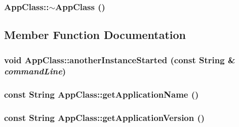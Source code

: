 \hypertarget{class_app_class_1bd714a99c6dadf6d662e15f27c77367}{
\subsubsection[{$\sim$AppClass}]{\setlength{\rightskip}{0pt plus 5cm}AppClass::$\sim$AppClass ()}}
\label{class_app_class_1bd714a99c6dadf6d662e15f27c77367}




\subsection{Member Function Documentation}
\hypertarget{class_app_class_40814b9baad74a9f271230bbf7e073a6}{
\subsubsection[{anotherInstanceStarted}]{\setlength{\rightskip}{0pt plus 5cm}void AppClass::anotherInstanceStarted (const String \& {\em commandLine})}}
\label{class_app_class_40814b9baad74a9f271230bbf7e073a6}


\hypertarget{class_app_class_8693d0a11cb9066661a4214ffb9d3f63}{
\subsubsection[{getApplicationName}]{\setlength{\rightskip}{0pt plus 5cm}const String AppClass::getApplicationName ()}}
\label{class_app_class_8693d0a11cb9066661a4214ffb9d3f63}


\hypertarget{class_app_class_1920f8e52b72532e579d9f9c8706298b}{
\subsubsection[{getApplicationVersion}]{\setlength{\rightskip}{0pt plus 5cm}const String AppClass::getApplicationVersion ()}}
\label{class_app_class_1920f8e52b72532e579d9f9c8706298b}


